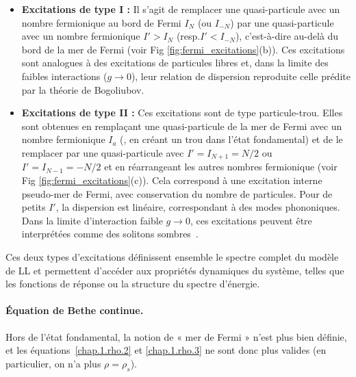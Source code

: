 \begin{itemize}[label = $\bullet$]
    \item \textbf{Excitations de type I :} Il s'agit de remplacer une quasi-particule avec un nombre fermionique au bord de Fermi $I_{N}$ (ou $I_{-N}$) par une quasi-particule avec un nombre fermionique $I'> I_N$ (resp.$I' <I_{-N}$), c’est-à-dire au-delà du bord de la mer de Fermi (voir Fig \ref{fig:fermi_excitations}(b)). Ces excitations sont analogues à des excitations de particules libres et, dans la limite des faibles interactions ($g \to 0$), leur relation de dispersion reproduite celle prédite par la théorie de Bogoliubov.

    \item \textbf{Excitations de type II :} Ces excitations sont de type particule-trou. Elles sont obtenues en remplaçant une quasi-particule de la mer de Fermi avec un nombre fermionique $I_a$ (\ie, en créant un trou dans l’état fondamental) et de le remplacer par une quasi-particule avec $I' = I_{N+1} = N/2$ ou $I' = I_{N-1} = -N/2$ et en réarrangeant les autres nombres fermionique (voir Fig \ref{fig:fermi_excitations}(c)). Cela correspond à une excitation interne  pseudo-mer de Fermi, avec conservation du nombre de particules. Pour de petits $I'$, la dispersion est linéaire, correspondant à des modes phononiques. Dans la limite d’interaction faible \( g \to 0 \), ces excitations peuvent être interprétées comme des solitons sombres~\cite{Ishikawa1980SolitonsIA,Karpiuk_2015}.
\end{itemize}

Ces deux types d’excitations définissent ensemble le spectre complet du modèle de \gls{LL} et permettent d’accéder aux propriétés dynamiques du système, telles que les fonctions de réponse ou la structure du spectre d’énergie.

\paragraph{Équation de Bethe continue.}

Hors de l’état fondamental, la notion de « mer de Fermi » n’est plus bien définie, et les équations~\eqref{chap.1.rho.2} et \eqref{chap.1.rho.3} ne sont donc plus valides (en particulier, on n’a plus $\rho = \rho_s$). 


